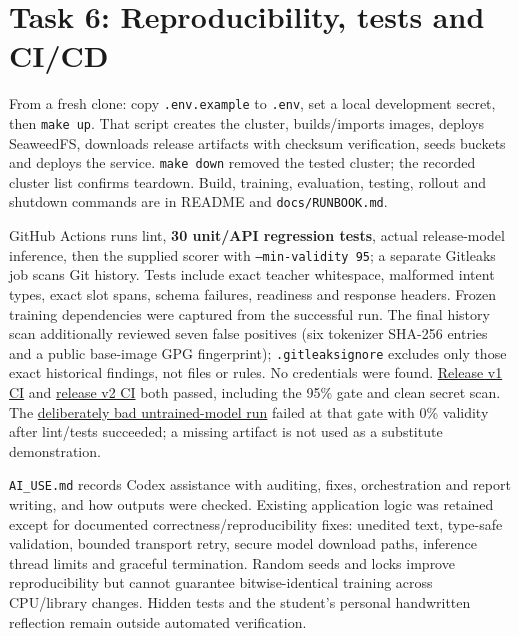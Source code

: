 \documentclass[10pt,a4paper]{article}
\begin{document}
\section{Task 6: Reproducibility, tests and CI/CD}

From a fresh clone: copy \texttt{.env.example} to \texttt{.env}, set a local development secret, then \texttt{make up}. That script creates the cluster, builds/imports images, deploys SeaweedFS, downloads release artifacts with checksum verification, seeds buckets and deploys the service. \texttt{make down} removed the tested cluster; the recorded cluster list confirms teardown. Build, training, evaluation, testing, rollout and shutdown commands are in README and \texttt{docs/\allowbreak{}RUNBOOK.md}.


GitHub Actions runs lint, \textbf{30 unit/API regression tests}, actual release-model inference, then the supplied scorer with \texttt{--min-validity 95}; a separate Gitleaks job scans Git history. Tests include exact teacher whitespace, malformed intent types, exact slot spans, schema failures, readiness and response headers. Frozen training dependencies were captured from the successful run. The final history scan additionally reviewed seven false positives (six tokenizer SHA-256 entries and a public base-image GPG fingerprint); \texttt{.gitleaksignore} excludes only those exact historical findings, not files or rules. No credentials were found. \href{https://github.com/lokesh1-cell/cloud-assignmnet/actions/runs/42493781600}{Release v1 CI} and \href{https://github.com/lokesh1-cell/cloud-assignmnet/actions/runs/42493785783}{release v2 CI} both passed, including the 95\% gate and clean secret scan. The \href{https://github.com/lokesh1-cell/cloud-assignmnet/actions/runs/42475597603}{deliberately bad untrained-model run} failed at that gate with 0\% validity after lint/tests succeeded; a missing artifact is not used as a substitute demonstration.


\texttt{AI\_\allowbreak{}USE.md} records Codex assistance with auditing, fixes, orchestration and report writing, and how outputs were checked. Existing application logic was retained except for documented correctness/reproducibility fixes: unedited text, type-safe validation, bounded transport retry, secure model download paths, inference thread limits and graceful termination. Random seeds and locks improve reproducibility but cannot guarantee bitwise-identical training across CPU/library changes. Hidden tests and the student's personal handwritten reflection remain outside automated verification.
\end{document}
